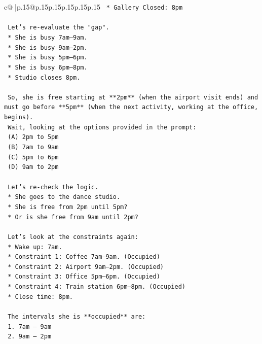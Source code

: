 \documentclass{article}
\begin{document}
{\begin{supertabular}{c@{$\;$}|p{.15\linewidth}@{}p{.15\linewidth}p{.15\linewidth}p{.15\linewidth}p{.15\linewidth}p{.15\linewidth}}
{{{\texttt{    *   Gallery Closed: 8pm} \\
\\ 
\texttt{    Let's re{-}evaluate the "gap".} \\
\texttt{    *   She is busy 7am–9am.} \\
\texttt{    *   She is busy 9am–2pm.} \\
\texttt{    *   She is busy 5pm–6pm.} \\
\texttt{    *   She is busy 6pm–8pm.} \\
\texttt{    *   Studio closes 8pm.} \\
\\ 
\texttt{    So, she is free starting at **2pm** (when the airport visit ends) and must go before **5pm** (when the next activity, working at the office, begins).} \\
\texttt{    Wait, looking at the options provided in the prompt:} \\
\texttt{    (A) 2pm to 5pm} \\
\texttt{    (B) 7am to 9am} \\
\texttt{    (C) 5pm to 6pm} \\
\texttt{    (D) 9am to 2pm} \\
\\ 
\texttt{    Let's re{-}check the logic.} \\
\texttt{    *   She goes to the dance studio.} \\
\texttt{    *   She is free from 2pm until 5pm?} \\
\texttt{    *   Or is she free from 9am until 2pm?} \\
\\ 
\texttt{    Let's look at the constraints again:} \\
\texttt{    *   Wake up: 7am.} \\
\texttt{    *   Constraint 1: Coffee 7am–9am. (Occupied)} \\
\texttt{    *   Constraint 2: Airport 9am–2pm. (Occupied)} \\
\texttt{    *   Constraint 3: Office 5pm–6pm. (Occupied)} \\
\texttt{    *   Constraint 4: Train station 6pm–8pm. (Occupied)} \\
\texttt{    *   Close time: 8pm.} \\
\\ 
\texttt{    The intervals she is **occupied** are:} \\
\texttt{    1.  7am – 9am} \\
\texttt{    2.  9am – 2pm} \\
}}}
\end{supertabular}}
\end{document}

